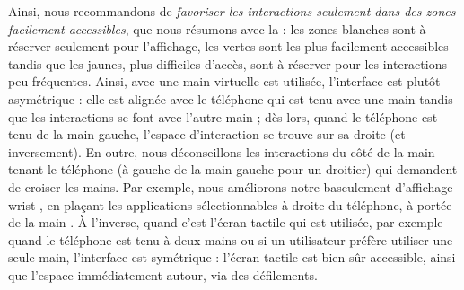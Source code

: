 

Ainsi, nous recommandons de \emph{favoriser les interactions seulement dans des zones facilement accessibles}, que nous résumons avec la  : les zones blanches sont à réserver seulement pour l'affichage, les vertes sont les plus facilement accessibles tandis que les jaunes, plus difficiles d'accès, sont à réserver pour les interactions peu fréquentes. Ainsi, avec une main virtuelle est utilisée, l'interface est plutôt asymétrique  : elle est alignée avec le téléphone qui est tenu avec une main tandis que les interactions se font avec l'autre main ; dès lors, quand le téléphone est tenu de la main gauche, l'espace d'interaction se trouve sur sa droite (et inversement). En outre, nous déconseillons les interactions du côté de la main tenant le téléphone (à gauche de la main gauche pour un droitier) qui demandent de croiser les mains. Par exemple, nous améliorons notre basculement d'affichage wrist , en plaçant les applications sélectionnables à droite du téléphone, à portée de la main . À l'inverse, quand c'est l'écran tactile qui est utilisée, par exemple quand le téléphone est tenu à deux mains ou si un utilisateur préfère utiliser une seule main, l'interface est symétrique  : l'écran tactile est bien sûr accessible, ainsi que l'espace immédiatement autour, via des défilements.

